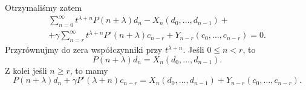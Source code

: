 %
Otrzymaliśmy zatem
%
\begin{multline*}
  \sum_{n=0}^{\infty} t^{\lambda+n} P(n+\lambda) d_n - X_n(d_0,\ldots,d_{n-1}) + \\ +
  \gamma \sum_{n=r}^{\infty} t^{\lambda+n} P'(n+\lambda) c_{n-r} + Y_{n-r}(c_0,\ldots,c_{n-r}) = 0.
\end{multline*}
%
Przyrównujmy do zera współczynniki przy $t^{\lambda+n}$. Jeśli $0 \leq n < r$, to
%
\begin{equation*}
  P(n+\lambda) d_n = X_n(d_0,\ldots,d_{n-1}).
\end{equation*}
%
Z kolei jeśli $n \geq r$, to mamy
%
\begin{equation*}
  P(n+\lambda) d_n + \gamma P'(\lambda+n) c_{n-r} = X_n(d_0,\ldots,d_{n-1}) + Y_{n-r}(c_0,\ldots,c_{n-r}).
\end{equation*}
%
%
%  
































